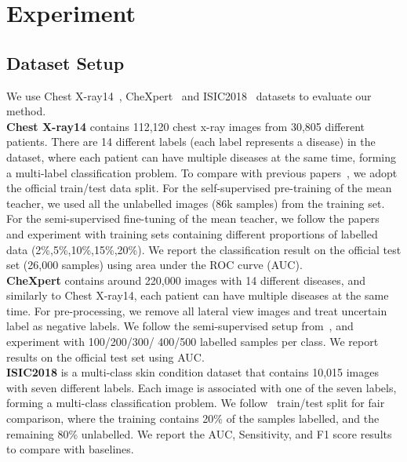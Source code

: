\documentclass[runningheads]{llncs}
\begin{document}
\vspace{-.1in}
\section{Experiment}
\vspace{-.1in}
\subsection{Dataset Setup}
We use Chest X-ray14~\cite{wang2017chestx}, CheXpert~\cite{irvin2019chexpert} and ISIC2018~\cite{tschandl2018ham10000, codella2019skin} datasets to evaluate our method. \\
\textbf{Chest X-ray14} contains 112,120 chest x-ray images from 30,805 different patients. There are 14 different labels (each label represents a disease) in the dataset, where each patient can have multiple diseases at the same time, forming a multi-label classification problem. To compare with previous papers~\cite{aviles2019graphx,liu2020semi}, we adopt the official train/test data split. For the self-supervised pre-training of the mean teacher, we used all the unlabelled images (86k samples) from the training set. For the semi-supervised fine-tuning of the mean teacher, we follow the papers~\cite{aviles2019graphx,liu2020semi} and experiment with training sets containing different proportions of labelled data (2\%,5\%,10\%,15\%,20\%). We report the classification result on the official test set (26,000 samples) using area under the ROC curve (AUC).\\
\textbf{CheXpert} contains around 220,000 images with 14 different diseases, and similarly to Chest X-ray14, each patient can have multiple diseases at the same time. For pre-processing, we remove all lateral view images and treat uncertain label as negative labels. We follow the semi-supervised setup from~\cite{gyawali2020semi}, and experiment with 100/200/300/ 400/500 labelled samples per class. We report results on the official test set using AUC.\\
\textbf{ISIC2018} is a multi-class skin condition dataset that contains 10,015 images with seven different labels. Each image is associated with one of the seven labels, forming a multi-class classification problem. We follow~\cite{liu2020semi} train/test split for fair comparison, where the training contains 20\% of the samples labelled, and the remaining 80\% unlabelled. We report the AUC, Sensitivity, and F1 score results to compare with baselines.
\end{document}
